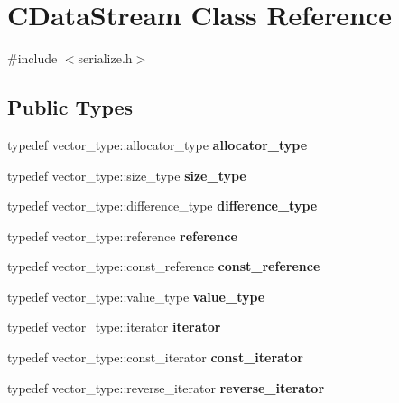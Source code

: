 \hypertarget{class_c_data_stream}{}\section{C\+Data\+Stream Class Reference}
\label{class_c_data_stream}


{\ttfamily \#include $<$serialize.\+h$>$}

\subsection*{Public Types}
\begin{DoxyCompactItemize}
\item 
\mbox{\label{class_c_data_stream_a297dff00e40bb161aab89fde868ee7b1}} 
typedef vector\+\_\+type\+::allocator\+\_\+type {\bfseries allocator\+\_\+type}
\item 
\mbox{\label{class_c_data_stream_a79e10daad6db0f94aea1e811eb167378}} 
typedef vector\+\_\+type\+::size\+\_\+type {\bfseries size\+\_\+type}
\item 
\mbox{\label{class_c_data_stream_a9da973fb6e53a5335db78b6f8b90bdbf}} 
typedef vector\+\_\+type\+::difference\+\_\+type {\bfseries difference\+\_\+type}
\item 
\mbox{\label{class_c_data_stream_a33723921305add93b45973243faf1541}} 
typedef vector\+\_\+type\+::reference {\bfseries reference}
\item 
\mbox{\label{class_c_data_stream_ada2ac4b4c962dd5a5dcccbc3f71e83ab}} 
typedef vector\+\_\+type\+::const\+\_\+reference {\bfseries const\+\_\+reference}
\item 
\mbox{\label{class_c_data_stream_a5572ddd57b7355f87781b89087dd18e0}} 
typedef vector\+\_\+type\+::value\+\_\+type {\bfseries value\+\_\+type}
\item 
\mbox{\label{class_c_data_stream_abed2013224bdf424e51c78bf483886d3}} 
typedef vector\+\_\+type\+::iterator {\bfseries iterator}
\item 
\mbox{\label{class_c_data_stream_abcfd79b72607505b22f18424e313b4c5}} 
typedef vector\+\_\+type\+::const\+\_\+iterator {\bfseries const\+\_\+iterator}
\item 
\mbox{\label{class_c_data_stream_a93ca1c317b7080997a20b0cf1920b39c}} 
typedef vector\+\_\+type\+::reverse\+\_\+iterator {\bfseries reverse\+\_\+iterator}
\end{DoxyCompactItemize}

